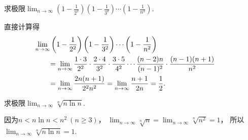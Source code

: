 \begin{example}
求极限\(\lim_{n\to\infty} \left(1-\frac1{2^2}\right) \left(1-\frac1{3^2}\right) \dotsm \left(1-\frac1{n^2}\right)\).
\begin{solution}
直接计算得\begin{align*}
	&\hspace{-20pt}
	\lim_{n\to\infty} \left(1-\frac1{2^2}\right) \left(1-\frac1{3^2}\right) \dotsm \left(1-\frac1{n^2}\right) \\
	&= \lim_{n\to\infty} \frac{1\cdot3}{2^2} \cdot \frac{2\cdot4}{3^2} \cdot \frac{3\cdot5}{4^2} \dotsm \frac{(n-2)n}{(n-1)^2} \cdot \frac{(n-1)(n+1)}{n^2} \\
	&= \lim_{n\to\infty} \frac{2n(n+1)}{2^2 n^2}
	= \lim_{n\to\infty} \frac{n+1}{2n}
	= \frac12.
\end{align*}
\end{solution}
\end{example}

\begin{example}
求极限\(\lim_{n\to\infty} \sqrt[n]{n \ln n}\).
\begin{solution}
因为\(n < n \ln n < n^2\ (n\geq3)\)，
\(\lim_{n\to\infty} \sqrt[n]{n}
= \lim_{n\to\infty} \sqrt[n]{n^2} = 1\)，
所以\(\lim_{n\to\infty} \sqrt[n]{n \ln n} = 1\).
\end{solution}
\end{example}
